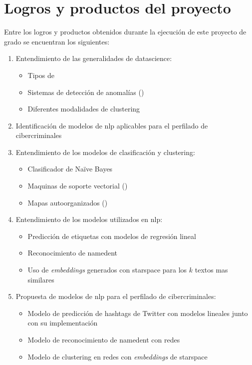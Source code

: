 \chapter{Logros y productos del proyecto} %

\label{chap:achievements} %

Entre los logros y productos obtenidos durante la ejecución de este proyecto de grado se encuentran los siguientes:

\begin{enumerate}
\item Entendimiento de las generalidades de \gls{datascience}:
  \begin{itemize}
  \item Tipos de 
  \item Sistemas de detección de anomalías ()
  \item Diferentes modalidades de \gls{clustering}
  \end{itemize}
\item Identificación de modelos de \gls{nlp} aplicables para el perfilado de cibercriminales
\item Entendimiento de los modelos de clasificación y \gls{clustering}:
  \begin{itemize}
  \item Clasificador de Na\"ive Bayes
  \item Maquinas de soporte vectorial ()
  \item Mapas autoorganizados ()
  \end{itemize}
\item Entendimiento de los modelos utilizados en \gls{nlp}:
  \begin{itemize}
  \item Predicción de etiquetas con modelos de regresión lineal
  \item Reconocimiento de \gls{namedent}
  \item Uso de \emph{embeddings} generados con \gls{starspace} para los $k$ textos mas similares
  \end{itemize}
\item Propuesta de modelos de \gls{nlp} para el perfilado de cibercriminales:
  \begin{itemize}
  \item Modelo de predicción de hashtags de Twitter con modelos lineales junto con su implementación
  \item Modelo de reconocimiento de \gls{namedent} con redes 
  \item Modelo de \gls{clustering} en redes  con \emph{embeddings} de \gls{starspace}
  \end{itemize}
\end{enumerate}
